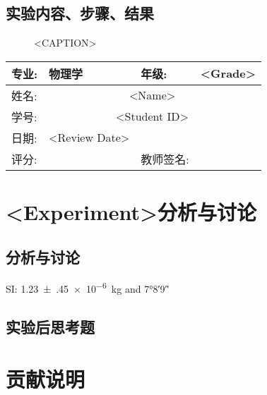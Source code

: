 \documentclass{ctexart}
\newcommand{\experimentname}{<Experiment>}
\newcommand{\student}{<Name>}
\newcommand{\Grade}{<Grade>}
\newcommand{\stuID}{<Student ID>}
\newcommand{\reviewdate}{<Review Date>}
\theoremstyle{ansstyle}
\newcommand{\reviewdata}{%
    \begin{center}
        \begin{tabular}{|p{2cm}|p{4cm}|p{4cm}|p{4cm}|}
            \hline
            专业: & 物理学 & 年级:  & \Grade \\
            \hline
            姓名:  & \multicolumn{3}{c|}{\student} \\
            \hline 
            学号:  & \multicolumn{3}{c|}{\stuID} \\
            \hline
            日期: & \reviewdate & & \\
            \hline
            评分: & & 教师签名: & \\
            \hline
        \end{tabular}
    \end{center}%
}
\begin{document}
\subsection{实验内容、步骤、结果}
\begin{figure}[H]
	\centering
	\caption{<CAPTION>}
\end{figure}

\newpage


\reviewdata

\section*{\experimentname 分析与讨论}


\subsection{分析与讨论}

SI: \SI{1.23(45)e-6}{\kilo\gram} and \ang{7;8;9}

\subsection{实验后思考题}


\appendix

\section{贡献说明}
\end{document}
